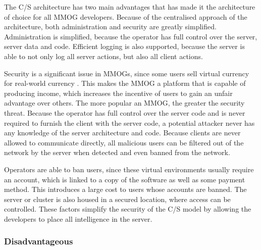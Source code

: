The C/S architecture has two main advantages that has made it the architecture of choice for all MMOG developers. Because of the centralised approach of the architecture, both administration and security are greatly simplified. Administration is simplified, because the operator has full control over the server, server data and code. Efficient logging is also supported, because the server is able to not only log all server actions, but also all client actions.

Security is a significant issue in MMOGs, since some users sell virtual currency for real-world currency \cite{chinese_gold_farmer}. This makes the MMOG a platform that is capable of producing income, which increases the incentive of users to gain an unfair advantage over others. The more popular an MMOG, the greater the security threat. Because the operator has full control over the server code and is never required to furnish the
client with the server code, a potential attacker never has any knowledge of the server architecture and code. Because clients are never allowed to communicate directly, all malicious users can be filtered out of the network by the server when detected and even banned from the network.

Operators are able to ban users, since these virtual environments usually require an account, which is linked to a copy of the software as well as some payment method. This introduces a large cost to users whose accounts are banned. The server or cluster is also housed in a secured location, where access can be controlled. These factors simplify the security of the C/S model by allowing the developers to place all intelligence in the server.

\subsubsection{Disadvantageous}
\label{classic_cs_disadvantages}

